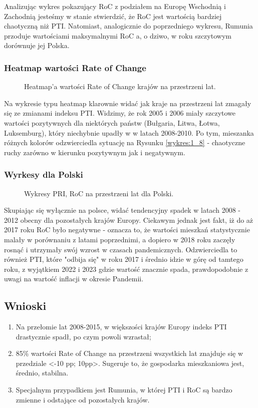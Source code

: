 \documentclass[12pt]{article}
\begin{document}
Analizując wykres pokazujący RoC z podziałem na Europę Wschodnią i Zachodnią jesteśmy w stanie stwierdzić, że RoC jest wartością bardziej chaotyczną niż 
PTI. Natomiast, analogicznie do poprzedniego wykresu, Rumunia przoduje wartościami maksymalnymi RoC a, o dziwo, w roku szczytowym dorównuje jej Polska.

\subsubsection{Heatmap wartości Rate of Change}
\begin{figure}[H]
    
    \caption{Heatmap'a wartości Rate of Change krajów na przestrzeni lat.}
\end{figure}

Na wykresie typu heatmap klarownie widać jak kraje na przestrzeni lat zmagały się ze zmianami indeksu PTI. Widzimy, że rok 2005 i 2006 miały szczytowe wartości pozytywnych 
dla niektórych państw (Bułgaria, Litwa, Łotwa, Luksemburg), który niechybnie upadły w w latach 2008-2010. Po tym, mieszanka różnych kolorów odzwierciedla sytuację na 
Rysunku \ref{wykres:1_8} - chaotyczne ruchy zarówno w kierunku pozytywnym jak i negatywnym.

\subsubsection{Wyrkesy dla Polski}
\begin{figure}[H]
    
    \caption{Wykresy PRI, RoC na przestrzeni lat dla Polski.}
\end{figure}

Skupiając się wyłącznie na polsce, widać tendencyjny spadek w latach 2008 - 2012 obecny dla pozostałych krajów Europy. Ciekawym jednak jest fakt, iż do aż 2017 roku
RoC było negatywne - oznacza to, że wartości mieszkań statystycznie malały w porównaniu z latami poprzednimi, a dopiero w 2018 roku zaczęły rosnąć i utrzymały swój 
wzrost w czasach pandemicznych. Odzwierciedla to również PTI, które "odbija się" w roku 2017 i średnio idzie w górę od tamtego roku, z wyjątkiem 2022 i 2023 
gdzie wartość znacznie spada, prawdopodobnie z uwagi na wartość inflacji w okresie Pandemii.

\newpage
\subsection{Wnioski}
\begin{enumerate}
    \item Na przełomie lat 2008-2015, w większości krajów Europy indeks PTI drastycznie spadł, po czym powoli wzrastał;
    \item 85\% wartości Rate of Change na przestrzeni wszystkich lat znajduje się w przedziale <-10 pp; 10pp>. Sugeruje to, że gospodarka mieszkaniowa jest, średnio, stabilna.
    \item Specjalnym przypadkiem jest Rumunia, w której PTI i RoC są bardzo zmienne i odstające od pozostałych krajów.
\end{enumerate}
\end{document}
